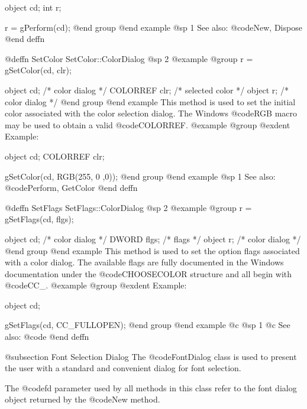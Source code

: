 object  cd;
int     r;

r = gPerform(cd);
@end group
@end example
@sp 1
See also:  @code{New, Dispose}
@end deffn









@deffn {SetColor} SetColor::ColorDialog
@sp 2
@example
@group
r = gSetColor(cd, clr);

object   cd;    /*  color dialog    */
COLORREF clr;   /*  selected color  */
object   r;     /*  color dialog    */
@end group
@end example
This method is used to set the initial color associated with the
color selection dialog.  The Windows @code{RGB} macro may be used
to obtain a valid @code{COLORREF}.
@example
@group
@exdent Example:

object  cd;
COLORREF clr;

gSetColor(cd, RGB(255, 0 ,0));
@end group
@end example
@sp 1
See also:  @code{Perform, GetColor}
@end deffn














@deffn {SetFlags} SetFlags::ColorDialog
@sp 2
@example
@group
r = gSetFlags(cd, flgs);

object  cd;     /*  color dialog  */
DWORD   flgs;   /*  flags         */
object  r;      /*  color dialog  */
@end group
@end example
This method is used to set the option flags associated with a color dialog.
The available flags are fully documented in the Windows documentation
under the @code{CHOOSECOLOR} structure and all begin with @code{CC_}.
@example
@group
@exdent Example:

object  cd;

gSetFlags(cd, CC_FULLOPEN);
@end group
@end example
@c @sp 1
@c See also:  @code{}
@end deffn











@subsection Font Selection Dialog
The @code{FontDialog} class is used to present the user with a standard
and convenient dialog for font selection.

The @code{fd} parameter used by all methods in this class refer to
the font dialog object returned by the @code{New} method.








